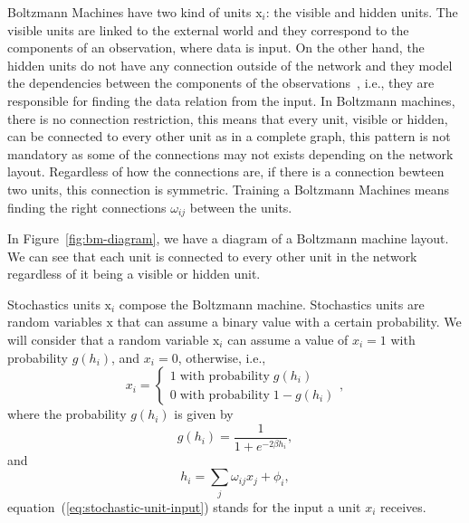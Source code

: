 Boltzmann Machines have two kind of units $\mathrm{x}_{i}$: the visible and hidden units. 
The visible units are linked to the external world and they correspond to the components of an observation, where data is input. On the other hand, the hidden units do not have any connection outside of the network and they model the dependencies between the components of the observations~\cite{bib:fischer2012}, i.e., they are responsible for finding the data relation from the input. 
In Boltzmann machines, there is no connection restriction, this means that every unit, visible or hidden, can be connected to every other unit as in a complete graph, this pattern is not mandatory as some of the connections may not exists depending on the network layout. 
Regardless of how the connections are, if there is a connection bewteen two units, this connection is symmetric. 
Training a Boltzmann Machines means finding the right connections $\omega_{ij}$ between the units.

In Figure~\ref{fig:bm-diagram}, we have a diagram of a Boltzmann machine layout. 
We can see that each unit is connected to every other unit in the network regardless of it being a visible or hidden unit.


Stochastics units $\mathrm{x}_{i}$ compose the Boltzmann machine. 
Stochastics units are random variables $\mathrm{x}$ that can assume a binary value with a certain probability.
We will consider that a random variable $\mathrm{x}_{i}$ can assume a value of $x_{i} = 1$ with probability $g(h_{i})$, and $x_{i} = 0$, otherwise, i.e.,
\begin{equation}
  \label{eq:stochastic-unit-values}
  x_{i} =
    \begin{cases}
      1 \; \text{with probability} \; g(h_{i}) \\
      0 \; \text{with probability} \; 1 - g(h_{i})
    \end{cases},
\end{equation}
where the probability $g(h_{i})$ is given by
\begin{equation}
  \label{eq:stochastic-unit-prob}
  g(h_{i}) = \frac{1}{1 + e^{-2 \beta h_{i}}},
\end{equation}
and
\begin{equation}
  \label{eq:stochastic-unit-input}
  h_{i} = \sum_{j}\omega_{ij}x_{j} + \phi_{i},
\end{equation}
equation~(\ref{eq:stochastic-unit-input}) stands for the input a unit $x_{i}$ receives.

